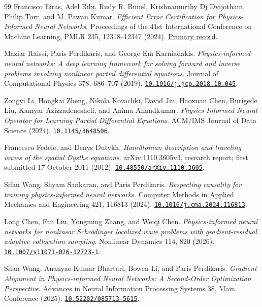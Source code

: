 \begin{thebibliography}{99}
Francisco Eiras, Adel Bibi, Rudy R. Bunel, Krishnamurthy Dj Dvijotham, Philip Torr, and M. Pawan Kumar.
\emph{Efficient Error Certification for Physics-Informed Neural Networks}.
Proceedings of the 41st International Conference on Machine Learning, PMLR 235, 12318--12347 (2024).
\href{https://proceedings.mlr.press/v235/eiras24a.html}{Primary record}.

Maziar Raissi, Paris Perdikaris, and George Em Karniadakis.
\emph{Physics-informed neural networks: A deep learning framework for solving forward and inverse problems involving nonlinear partial differential equations}.
Journal of Computational Physics 378, 686--707 (2019).
\href{https://doi.org/10.1016/j.jcp.2018.10.045}{\nolinkurl{10.1016/j.jcp.2018.10.045}}.

Zongyi Li, Hongkai Zheng, Nikola Kovachki, David Jin, Haoxuan Chen, Burigede Liu, Kamyar Azizzadenesheli, and Anima Anandkumar.
\emph{Physics-Informed Neural Operator for Learning Partial Differential Equations}.
ACM/IMS Journal of Data Science (2024).
\href{https://doi.org/10.1145/3648506}{\nolinkurl{10.1145/3648506}}.

Francesco Fedele, and Denys Dutykh.
\emph{Hamiltonian description and traveling waves of the spatial Dysthe equations}.
arXiv:1110.3605v3, research report; first submitted 17 October 2011 (2012).
\href{https://doi.org/10.48550/arXiv.1110.3605}{\nolinkurl{10.48550/arXiv.1110.3605}}.

Sifan Wang, Shyam Sankaran, and Paris Perdikaris.
\emph{Respecting causality for training physics-informed neural networks}.
Computer Methods in Applied Mechanics and Engineering 421, 116813 (2024).
\href{https://doi.org/10.1016/j.cma.2024.116813}{\nolinkurl{10.1016/j.cma.2024.116813}}.

Long Chen, Fan Liu, Yongming Zhang, and Weiqi Chen.
\emph{Physics-informed neural networks for nonlinear Schr\"{o}dinger localized wave problems with gradient-residual adaptive collocation sampling}.
Nonlinear Dynamics 114, 820 (2026).
\href{https://doi.org/10.1007/s11071-026-12723-1}{\nolinkurl{10.1007/s11071-026-12723-1}}.

Sifan Wang, Ananyae Kumar Bhartari, Bowen Li, and Paris Perdikaris.
\emph{Gradient Alignment in Physics-informed Neural Networks: A Second-Order Optimization Perspective}.
Advances in Neural Information Processing Systems 38, Main Conference (2025).
\href{https://doi.org/10.52202/085713-5615}{\nolinkurl{10.52202/085713-5615}}.


\end{thebibliography}
